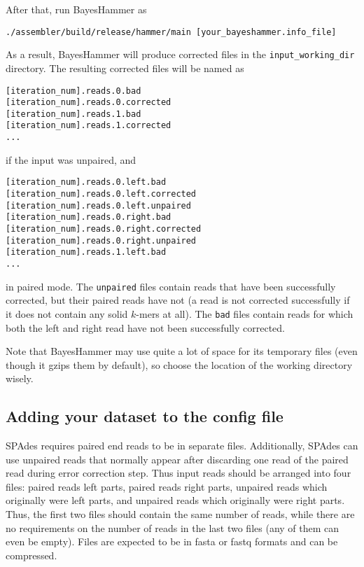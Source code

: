 \documentclass{article}
\def\spades{SPAdes}
\def\bh{BayesHammer}
\begin{document}
After that, run {\bh} as
\begin{verbatim}
./assembler/build/release/hammer/main [your_bayeshammer.info_file]
\end{verbatim}

As a result, {\bh} will produce corrected files in the \verb$input_working_dir$ directory. The resulting corrected files will be named as
\begin{verbatim}
[iteration_num].reads.0.bad
[iteration_num].reads.0.corrected
[iteration_num].reads.1.bad
[iteration_num].reads.1.corrected
...
\end{verbatim}
if the input was unpaired, and
\begin{verbatim}
[iteration_num].reads.0.left.bad
[iteration_num].reads.0.left.corrected
[iteration_num].reads.0.left.unpaired
[iteration_num].reads.0.right.bad
[iteration_num].reads.0.right.corrected
[iteration_num].reads.0.right.unpaired
[iteration_num].reads.1.left.bad
...
\end{verbatim}
in paired mode. The \verb$unpaired$ files contain reads that have been successfully corrected, but their paired reads have not
(a read is not corrected successfully if it does not contain any solid $k$-mers at all). The \verb$bad$ files contain reads for which
both the left and right read have not been successfully corrected.

Note that {\bh} may use quite a lot of space for its temporary files (even though it gzips them by default), so choose the location
of the working directory wisely.

\subsection{Adding your dataset to the config file}\label{subsec:datasets}
{\spades} requires paired end reads to be in separate files.
Additionally, {\spades} can use unpaired reads that normally appear after discarding one read of the paired read during error correction step.
Thus input reads should be arranged into four files: paired reads left parts, paired reads right parts, unpaired reads which originally were left parts, and
unpaired reads which originally were right parts. Thus, the first two files should contain the same number of reads, while
there are no requirements on the number of reads in the last two files (any of them can even be empty).
Files are expected to be in fasta or fastq formats and can be compressed.
\end{document}
